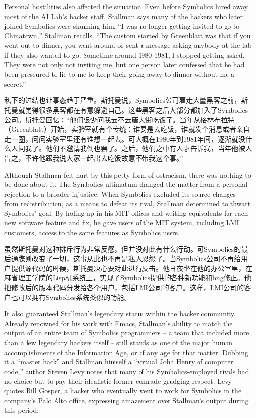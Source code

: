 \ifdefined\eng
Personal hostilities also affected the situation.   Even before Symbolics hired away most of the AI Lab's hacker staff, Stallman says many of the hackers who later joined Symbolics were shunning him. ``I was no longer getting invited to go to Chinatown,'' Stallman recalls. ``The custom started by Greenblatt was that if you went out to dinner, you went around or sent a message asking anybody at the lab if they also wanted to go. Sometime around 1980-1981, I stopped getting asked. They were not only not inviting me, but one person later confessed that he had been pressured to lie to me to keep their going away to dinner without me a secret.''
\fi

\ifdefined\chs
私下的过结也让事态趋于严重。斯托曼说，Symbolics公司雇走大量黑客之前，斯托曼就觉得很多黑客都在有意躲避自己。这些黑客之后大部分都加入了Symbolics公司。斯托曼回忆：``他们很少问我去不去唐人街吃饭了。当年从格林布拉特（Greenblatt）开始，实验室就有个传统：谁要是去吃饭，谁就发个消息或者亲自走一圈，问问实验室里还有谁想一起去。可大概在1980年到1981年间，逐渐就没什么人问我了。他们不邀请我倒也罢了。之后，他们之中有人才告诉我，当年他被人告之，不许他跟我说大家一起出去吃饭故意不带我这个事。''
\fi

\ifdefined\eng
Although Stallman felt hurt by this petty form of ostracism, there was nothing to be done about it.  The Symbolics ultimatum changed the matter from a personal rejection to a broader injustice. When Symbolics excluded its source changes from redistribution, as a means to defeat its rival, Stallman determined to thwart Symbolics' goal. By holing up in his MIT offices and writing equivalents for each new software feature and fix, he gave users of the MIT system, including LMI customers, access to the same features as Symbolics users.
\fi

\ifdefined\chs
虽然斯托曼对这种排斥行为非常反感，但并没对此有什么行动。可Symbolics的最后通牒则改变了一切，这事从此也不再是私人恩怨了。当Symbolics公司不再给用户提供源代码的时候，斯托曼决心要对此进行反击。他日夜坐在他的办公室里，在麻省理工学院的Lisp机系统上，实现了Symbolics提供的各种新功能和bug修正。他把修改后的版本代码分发给各个用户，包括LMI公司的客户。这样，LMI公司的客户也可以拥有Symbolics系统类似的功能。
\fi

\ifdefined\eng
It also guaranteed Stallman's legendary status within the hacker community. Already renowned for his work with Emacs, Stallman's ability to match the output of an entire team of Symbolics programmers -- a team that included more than a few legendary hackers itself -- still stands as one of the major human accomplishments of the Information Age, or of any age for that matter. Dubbing it a ``master hack'' and Stallman himself a ``virtual John Henry of computer code,'' author Steven Levy notes that many of his Symbolics-employed rivals had no choice but to pay their idealistic former comrade grudging respect. Levy quotes Bill Gosper, a hacker who eventually went to work for Symbolics in the company's Palo Alto office, expressing amazement over Stallman's output during this period:
\fi

